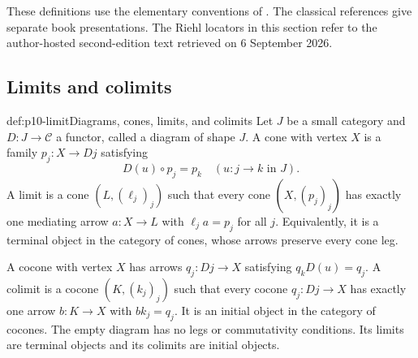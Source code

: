 These definitions use the elementary conventions of
\cite[Chapter~1, especially Definitions~1.1.1, 1.3.1, 1.4.1,
and 1.4.3]{Riehl2026ContextOnline}.  The classical references
\cite{MacLane1998,Awodey2010} give separate book presentations.
The Riehl locators in this section refer to the author-hosted
second-edition text retrieved on 6 September 2026.

\subsection{Limits and colimits}

\begin{hbdefinition}{def:p10-limit}{Diagrams, cones, limits, and colimits}
Let \(J\) be a small category and \(D:J\to\mathcal C\) a functor,
called a diagram of shape \(J\).
A cone with vertex \(X\) is a family \(p_j:X\to D j\) satisfying
\[
                         D(u)\circ p_j=p_k
                         \quad(u:j\to k\text{ in }J).
\]
A limit is a cone \((L,(\ell_j)_j)\) such that every cone
\((X,(p_j)_j)\) has exactly one mediating arrow \(a:X\to L\)
with \(\ell_j a=p_j\) for all \(j\).
Equivalently, it is a terminal object in the category of cones,
whose arrows preserve every cone leg.

A cocone with vertex \(X\) has arrows \(q_j:D j\to X\) satisfying
\(q_k D(u)=q_j\).  A colimit is a cocone \((K,(k_j)_j)\) such that
every cocone \(q_j:D j\to X\) has exactly one arrow \(b:K\to X\)
with \(b k_j=q_j\).  It is an initial object in the category of
cocones.  The empty diagram has no legs or commutativity conditions.
Its limits are terminal objects and its colimits are initial
objects.
\end{hbdefinition}

